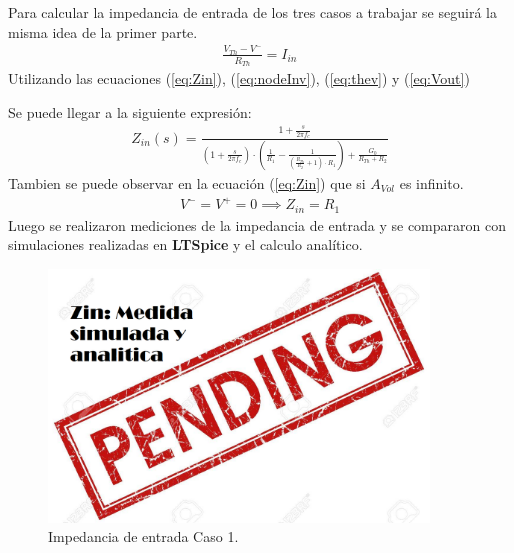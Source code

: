Para calcular la impedancia de entrada de los tres casos a trabajar se seguirá la misma idea de la primer parte.
\begin{align}
\label{eq:Zin}
\frac{V_{Th} - V^-}{R_{Th}}=I_{in}
\end{align}
Utilizando las ecuaciones (\ref{eq:Zin}), (\ref{eq:nodeInv}), (\ref{eq:thev}) y (\ref{eq:Vout})

Se puede llegar a la siguiente expresión:
\begin{align}
	Z_{in}(s)=\frac{1+\frac{s}{2\pi f_c}}{(1+\frac{s}{2\pi f_c}) \cdot \left( \frac{1}{R_1} - \frac{1}{(\frac{R_{Th}}{R_2}+1 ) \cdot R_1}\right) + \frac{G_0}{R_{Th}+R_2}}
\end{align}
Tambien se puede observar en la ecuación (\ref{eq:Zin}) que si $A_{Vol}$ es infinito.
\begin{align} V^- = V^+=0 \implies Z_{in}=R_1
\end{align}
Luego se realizaron mediciones de la impedancia de entrada y se compararon con simulaciones realizadas en \textbf{LTSpice} y el calculo analítico.

\begin{figure}[H]	
	\centering
	\includegraphics[width=0.9\textwidth]{Ejercicio1/Imagenes/ZinC1.png}
	\caption{Impedancia de entrada Caso 1.}
	\label{fig:CompZinC1}
\end{figure} 

